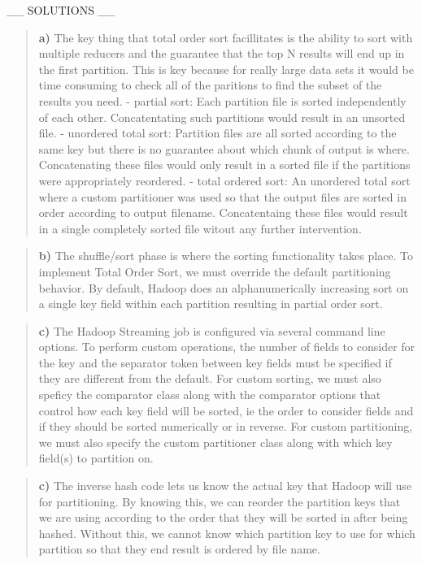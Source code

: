 \documentclass[11pt]{article}
\begin{document}
\_\_ SOLUTIONS \_\_

\begin{quote}
\textbf{a)} The key thing that total order sort facillitates is the
ability to sort with multiple reducers and the guarantee that the top N
results will end up in the first partition. This is key because for
really large data sets it would be time consuming to check all of the
paritions to find the subset of the results you need. - partial sort:
Each partition file is sorted independently of each other.
Concatentating such partitions would result in an unsorted file. -
unordered total sort: Partition files are all sorted according to the
same key but there is no guarantee about which chunk of output is where.
Concatenating these files would only result in a sorted file if the
partitions were appropriately reordered. - total ordered sort: An
unordered total sort where a custom partitioner was used so that the
output files are sorted in order according to output filename.
Concatentaing these files would result in a single completely sorted
file witout any further intervention.
\end{quote}

\begin{quote}
\textbf{b)} The shuffle/sort phase is where the sorting functionality
takes place. To implement Total Order Sort, we must override the default
partitioning behavior. By default, Hadoop does an alphanumerically
increasing sort on a single key field within each partition resulting in
partial order sort.
\end{quote}

\begin{quote}
\textbf{c)} The Hadoop Streaming job is configured via several command
line options. To perform custom operations, the number of fields to
consider for the key and the separator token between key fields must be
specified if they are different from the default. For custom sorting, we
must also speficy the comparator class along with the comparator options
that control how each key field will be sorted, ie the order to consider
fields and if they should be sorted numerically or in reverse. For
custom partitioning, we must also specify the custom partitioner class
along with which key field(s) to partition on.
\end{quote}

\begin{quote}
\textbf{c)} The inverse hash code lets us know the actual key that
Hadoop will use for partitioning. By knowing this, we can reorder the
partition keys that we are using according to the order that they will
be sorted in after being hashed. Without this, we cannot know which
partition key to use for which partition so that they end result is
ordered by file name.
\end{quote}
\end{document}

